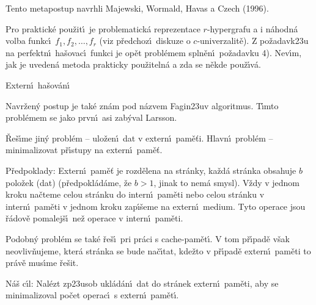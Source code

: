 \documentclass[a4paper,12pt]{article}
\begin{document}
\flushpar Tento metapostup navrhli Majewski, Wormald, Havas a Czech (1996).
\medskip

\flushpar Pro praktick\'e pou\v zit\'\i\ je problematick\'a 
reprezentace $r$-hyper\-gra\-fu a i n\'ahodn\'a volba funkc\'\i\ 
$f_1,f_2,\dots,f_r$ (viz p\v redchoz\'\i\ diskuze o $c$-univerzalit\v e).  Z 
po\v zadavk\accent23u na perfektn\'\i\ ha\v sovac\'\i\ funkci je op\v et 
probl\'emem spln\v en\'\i\ po\v za\-davku 4).  Nev\'\i m, jak je uveden\'a 
metoda prakticky pou\-\v zi\-teln\'a a zda se n\v ekde pou\v z\'\i v\'a.  

\heading
Extern\'\i\ ha\v sov\'an\'\i
\endheading

\flushpar Navr\v zen\'y postup je tak\'e zn\'am pod n\'azvem Fagin\accent23uv algoritmus. T\'\i mto probl\'emem se jako prvn\'\i\ asi zab\'yval Larsson.
\medskip

\flushpar\v Re\v s\'\i me jin\'y probl\'em -- ulo\v zen\'\i\ dat v extern\'\i\ 
pam\v e\v ti. Hlavn\'\i\ probl\'em -- minimalizovat p\v r\'\i stupy na 
extern\'\i\ pam\v e\v t. 
\medskip

\flushpar P\v redpoklady:  Extern\'\i\ pam\v e\v t je rozd\v elena na 
str\'anky, ka\v zd\'a str\'anka obsahuje $b$ polo\v zek (dat) 
(p\v redpokl\'ad\'ame, \v ze $b>1$, jinak to nem\'a smysl).  V\v zdy v 
jednom kroku na\v cteme celou str\'anku do intern\'\i\ pam\v eti 
nebo celou str\'anku v intern\'\i\ pam\v eti v jednom kroku 
zap\'\i\v seme na extern\'\i\ medium.  Tyto operace jsou \v r\'adov\v e 
pomalej\v s\'\i\ ne\v z operace v intern\'\i\ pam\v eti.  
\medskip

\flushpar Podobn\'y probl\'em se tak\'e \v re\v s\'\i\ pri pr\'aci s cache-pam\v et\'\i . V tom p\v r\'\i pad\v e v\v sak 
neovliv\v nujeme, kter\'a str\'anka se bude na\v c\'\i tat, kde\v zto v p\v r\'\i pad\v e extern\'\i\ pam\v eti to pr\'av\v e mus\'\i me \v re\v sit.
\smallskip

\flushpar N\'a\v s c\'\i l:  
Nal\'ezt zp\accent23usob ukl\'ad\'an\'\i\ dat do str\'anek extern\'\i\ 
pam\v eti, aby se minimalizoval po\v cet operac\'\i\ s extern\'\i\ 
pam\v et\'\i .  
\medskip
\end{document}
